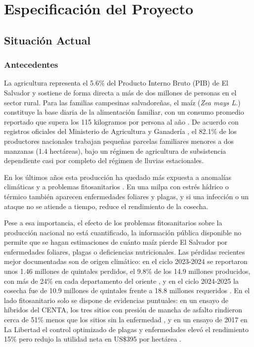 \chapter{Especificaci\'on del Proyecto}

\section{Situaci\'on Actual}

\subsection{Antecedentes}

La agricultura representa el 5.6\% del Producto Interno Bruto (PIB) de El Salvador \cite{bcr2023} y sostiene de forma directa a m\'as de dos millones de personas en el sector rural. Para las familias campesinas salvadore\~nas, el ma\'iz (\textit{Zea mays L.}) constituye la base diaria de la alimentaci\'on familiar, con un consumo promedio reportado que supera los 115 kilogramos por persona al a\~no \cite{centa2022}. De acuerdo con registros oficiales del Ministerio de Agricultura y Ganader\'ia \cite{mag2023}, el 82.1\% de los productores nacionales trabajan peque\~nas parcelas familiares menores a dos manzanas (1.4 hect\'areas), bajo un r\'egimen de agricultura de subsistencia dependiente casi por completo del r\'egimen de lluvias estacionales.

En los \'ultimos a\~nos esta producci\'on ha quedado m\'as expuesta a anomal\'ias clim\'aticas y a problemas fitosanitarios \cite{mag2023}. En una milpa con estr\'es h\'idrico o t\'ermico tambi\'en aparecen enfermedades foliares y plagas, y si una infecci\'on o un ataque no se atiende a tiempo, reduce el rendimiento de la cosecha.

Pese a esa importancia, el efecto de los problemas fitosanitarios sobre la producci\'on nacional no est\'a cuantificado, la informaci\'on p\'ublica disponible no permite que se hagan estimaciones de cu\'anto ma\'iz pierde El Salvador por enfermedades foliares, plagas o deficiencias nutricionales. Las p\'erdidas recientes mejor documentadas son de origen clim\'atico: en el ciclo 2023-2024 se reportaron unos 1.46 millones de quintales perdidos, el 9.8\% de los 14.9 millones producidos, con m\'as de 24\% en cada departamento del oriente \cite{edh2024}, y en el ciclo 2024-2025 la cosecha fue de 10.9 millones de quintales frente a 18.8 millones requeridos \cite{elmundo2025}. En el lado fitosanitario solo se dispone de evidencias puntuales: en un ensayo de h\'ibridos del CENTA, los tres sitios con presi\'on de mancha de asfalto rindieron cerca de 51\% menos que los sitios sin la enfermedad \cite{deras2015}, y en un ensayo de 2017 en La Libertad el control optimizado de plagas y enfermedades elev\'o el rendimiento 15\% pero redujo la utilidad neta en US\$395 por hect\'area \cite{eash2019}.

